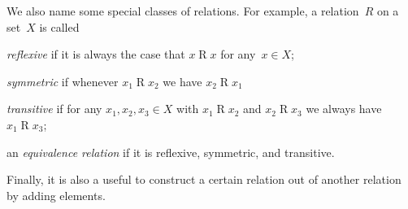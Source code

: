 We also name some special classes of relations. For example,
a relation~$R$ on a set~$X$ is called
\begin{inparaenum}[(a)]
  \item \emph{reflexive} if it is always the case that $x\mathbin{R}x$ for
    any~$x \in X$;
  \item \emph{symmetric} if whenever $x_1 \mathbin{R} x_2$ we have $x_2
    \mathbin{R} x_1$
  \item \emph{transitive} if for any $x_1, x_2, x_3 \in X$ with $x_1 \mathbin{R}
    x_2$ and $x_2 \mathbin{R} x_3$ we always have $x_1 \mathbin{R} x_3$;
  \item an \emph{equivalence relation} if it is reflexive, symmetric, and
    transitive.
\end{inparaenum}

Finally, it is also a useful to construct a certain relation out of another
relation by adding elements. 
